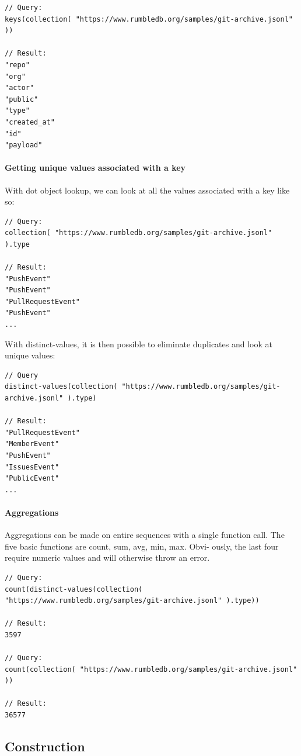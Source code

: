 \begin{lstlisting}[style=json]
// Query:
keys(collection( "https://www.rumbledb.org/samples/git-archive.jsonl" ))

// Result:
"repo"
"org"
"actor"
"public"
"type"
"created_at"
"id"
"payload"
\end{lstlisting}

\paragraph{Getting unique values associated with a key}
With dot object lookup, we can look at all the values associated with a key like so:

\begin{lstlisting}[style=json]
// Query:
collection( "https://www.rumbledb.org/samples/git-archive.jsonl" ).type

// Result:
"PushEvent"
"PushEvent"
"PullRequestEvent"
"PushEvent"
...
\end{lstlisting}

With distinct-values, it is then possible to eliminate duplicates and look at unique values:

\begin{lstlisting}[style=json]
// Query
distinct-values(collection( "https://www.rumbledb.org/samples/git-archive.jsonl" ).type)

// Result:
"PullRequestEvent"
"MemberEvent"
"PushEvent"
"IssuesEvent"
"PublicEvent"
...
\end{lstlisting}

\paragraph{Aggregations}
Aggregations can be made on entire sequences with a single function call. The five basic functions are count, sum, avg, min, max. Obvi- ously, the last four require numeric values and will otherwise throw an error.

\begin{lstlisting}[style=json]
// Query:
count(distinct-values(collection( "https://www.rumbledb.org/samples/git-archive.jsonl" ).type))

// Result:
3597

// Query:
count(collection( "https://www.rumbledb.org/samples/git-archive.jsonl" ))

// Result:
36577
\end{lstlisting}


\subsection{Construction}

